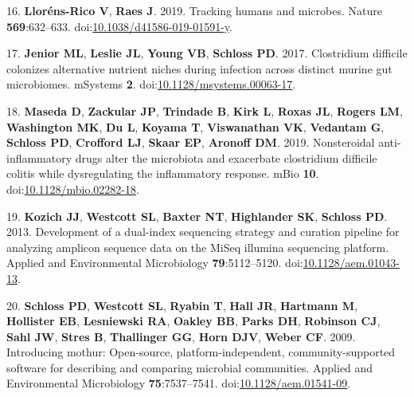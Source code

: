 \documentclass[11pt,]{article}
\begin{document}
\hypertarget{ref-LlornsRico2019}{}
16. \textbf{Lloréns-Rico V}, \textbf{Raes J}. 2019. Tracking humans and
microbes. Nature \textbf{569}:632--633.
doi:\href{https://doi.org/10.1038/d41586-019-01591-y}{10.1038/d41586-019-01591-y}.

\hypertarget{ref-Jenior2017}{}
17. \textbf{Jenior ML}, \textbf{Leslie JL}, \textbf{Young VB},
\textbf{Schloss PD}. 2017. Clostridium difficile colonizes alternative
nutrient niches during infection across distinct murine gut microbiomes.
mSystems \textbf{2}.
doi:\href{https://doi.org/10.1128/msystems.00063-17}{10.1128/msystems.00063-17}.

\hypertarget{ref-Maseda2019}{}
18. \textbf{Maseda D}, \textbf{Zackular JP}, \textbf{Trindade B},
\textbf{Kirk L}, \textbf{Roxas JL}, \textbf{Rogers LM},
\textbf{Washington MK}, \textbf{Du L}, \textbf{Koyama T},
\textbf{Viswanathan VK}, \textbf{Vedantam G}, \textbf{Schloss PD},
\textbf{Crofford LJ}, \textbf{Skaar EP}, \textbf{Aronoff DM}. 2019.
Nonsteroidal anti-inflammatory drugs alter the microbiota and exacerbate
clostridium difficile colitis while dysregulating the inflammatory
response. mBio \textbf{10}.
doi:\href{https://doi.org/10.1128/mbio.02282-18}{10.1128/mbio.02282-18}.

\hypertarget{ref-Kozich2013}{}
19. \textbf{Kozich JJ}, \textbf{Westcott SL}, \textbf{Baxter NT},
\textbf{Highlander SK}, \textbf{Schloss PD}. 2013. Development of a
dual-index sequencing strategy and curation pipeline for analyzing
amplicon sequence data on the MiSeq illumina sequencing platform.
Applied and Environmental Microbiology \textbf{79}:5112--5120.
doi:\href{https://doi.org/10.1128/aem.01043-13}{10.1128/aem.01043-13}.

\hypertarget{ref-Schloss2009}{}
20. \textbf{Schloss PD}, \textbf{Westcott SL}, \textbf{Ryabin T},
\textbf{Hall JR}, \textbf{Hartmann M}, \textbf{Hollister EB},
\textbf{Lesniewski RA}, \textbf{Oakley BB}, \textbf{Parks DH},
\textbf{Robinson CJ}, \textbf{Sahl JW}, \textbf{Stres B},
\textbf{Thallinger GG}, \textbf{Horn DJV}, \textbf{Weber CF}. 2009.
Introducing mothur: Open-source, platform-independent,
community-supported software for describing and comparing microbial
communities. Applied and Environmental Microbiology
\textbf{75}:7537--7541.
doi:\href{https://doi.org/10.1128/aem.01541-09}{10.1128/aem.01541-09}.
\end{document}
